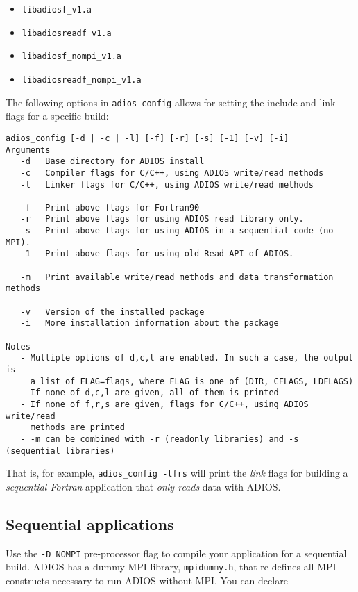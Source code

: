 \begin{itemize}
\item \verb+libadiosf_v1.a           +
\item \verb+libadiosreadf_v1.a       +
\item \verb+libadiosf_nompi_v1.a     +
\item \verb+libadiosreadf_nompi_v1.a +
\end{itemize}

The following options in \verb+adios_config+ allows for setting the include and link flags for a specific build:

\begin{lstlisting}
adios_config [-d | -c | -l] [-f] [-r] [-s] [-1] [-v] [-i]
Arguments
   -d   Base directory for ADIOS install
   -c   Compiler flags for C/C++, using ADIOS write/read methods
   -l   Linker flags for C/C++, using ADIOS write/read methods

   -f   Print above flags for Fortran90
   -r   Print above flags for using ADIOS read library only.
   -s   Print above flags for using ADIOS in a sequential code (no MPI).
   -1   Print above flags for using old Read API of ADIOS.

   -m   Print available write/read methods and data transformation methods

   -v   Version of the installed package
   -i   More installation information about the package

Notes
   - Multiple options of d,c,l are enabled. In such a case, the output is
     a list of FLAG=flags, where FLAG is one of (DIR, CFLAGS, LDFLAGS)
   - If none of d,c,l are given, all of them is printed
   - If none of f,r,s are given, flags for C/C++, using ADIOS write/read
     methods are printed
   - -m can be combined with -r (readonly libraries) and -s (sequential libraries)
\end{lstlisting}

That is, for example, \verb+adios_config -lfrs+ will print the \emph{link} flags for building
a \emph{sequential Fortran} application that \emph{only reads} data with ADIOS.

\subsection{Sequential applications}

Use the \verb+-D_NOMPI+ pre-processor flag to compile your application
for a sequential build. ADIOS has a dummy MPI library, \verb+mpidummy.h+, that re-defines
all MPI constructs necessary to run ADIOS without MPI. You can declare

